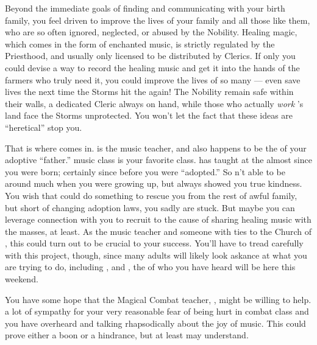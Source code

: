 \documentclass[char]{GL2020}
\begin{document}
Beyond the immediate goals of finding and communicating with your birth family, you feel driven to improve the lives of your family and all those like them, who are so often ignored, neglected, or abused by the Nobility. Healing magic, which comes in the form of enchanted music, is strictly regulated by the Priesthood, and usually only licensed to be distributed by Clerics. If only you could devise a way to record the healing music and get it into the hands of the farmers who truly need it, you could improve the lives of so many — even save lives the next time the Storms hit the \pFarm{} again! The Nobility remain safe within their walls, a dedicated Cleric always on hand, while those who actually \emph{work} \cFarmGod{}'s land face the Storms unprotected. You won't let the fact that these ideas are ``heretical'' stop you.

That is where \cMusic{\full} comes in. \cMusic{} is the music teacher, and also happens to be the \cMusic{\auncle} of your adoptive ``father.'' \cMusic{\Their} music class is your favorite class. \cMusic{} has taught at the \pSchool{} almost since you were born; certainly since before you were ``adopted.'' So \cMusic{\theywere}n’t able to be around much when you were growing up, but \cMusic{\they} always showed you true kindness. You wish that \cMusic{} could do something to rescue you from the rest of \cMusic{\their} awful family, but short of \cMusic{\them} changing adoption laws, you sadly are stuck. But maybe you can leverage \cMusic{\their} connection with you to recruit \cMusic{} to the cause of sharing healing music with the masses, at least. As the music teacher and someone with ties to the Church of \cFarmGod{}, this could turn out to be crucial to your success. You'll have to tread carefully with this project, though, since many adults will likely look askance at what you are trying to do, including \cMusic{} \cMusic{\themself}, and \cHedonist{\full}, the \cHedonist{\cleric} of \cFarmGod{} who you have heard will be here this weekend.

You have some hope that the Magical Combat teacher, \cInterpol{\full}, might be willing to help. \cInterpol{\Theyhave} a lot of sympathy for your very reasonable fear of being hurt in combat class and you have overheard \cMusic{} and \cInterpol{} talking rhapsodically about the joy of music. This could prove either a boon or a hindrance, but at least \cInterpol{\they} may understand.  
\end{document}
